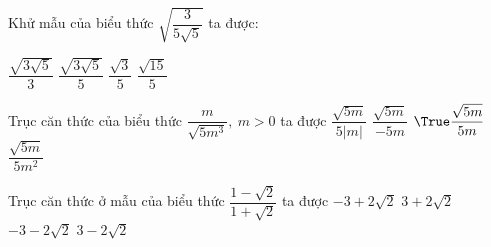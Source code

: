 \begin{bt}
	Khử mẫu của biểu thức $ \sqrt{\dfrac{3}{5\sqrt{5}}} $ ta được:
	
	\choice
	{ $ \dfrac{\sqrt{3 \sqrt{5}}}{3}$ }
	{\True $\dfrac{\sqrt{3 \sqrt{5}}}{5}$}
	{$\dfrac{\sqrt{3}}{5}$ }
	{$\dfrac{\sqrt{15}}{5} $ } 
	
\end{bt}

\begin{bt}
	Trục căn thức của biểu thức $\dfrac{m}{\sqrt{5m^3}},\ m>0$ ta được
	\choice
	{$\dfrac{\sqrt{5m}}{5|m|}$ }
	{$\dfrac{\sqrt{5m}}{-5m}$ }
	{$\True \dfrac{\sqrt{5m}}{5m}$ }
	{$\dfrac{\sqrt{5m}}{5m^2}$ }
\end{bt}

\begin{bt} 
	Trục căn thức ở mẫu của biểu thức $\dfrac{1- \sqrt{2}}{1+\sqrt{2}}$ ta được
	\choice
	{\True $-3+2 \sqrt{2}$}
	{$3+2 \sqrt{2}$ }
	{$-3-2 \sqrt{2}$ }
	{$3-2 \sqrt{2}$ }
\end{bt}
